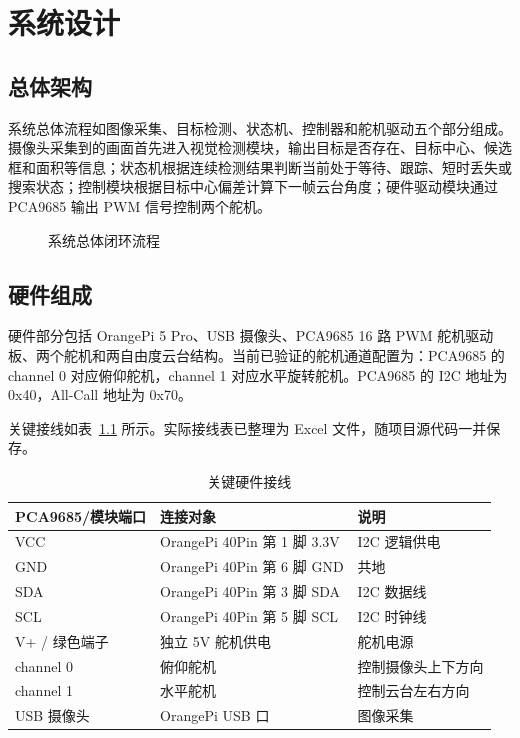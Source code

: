 \chapter{系统设计}

\section{总体架构}

系统总体流程如图像采集、目标检测、状态机、控制器和舵机驱动五个部分组成。摄像头采集到的画面首先进入视觉检测模块，输出目标是否存在、目标中心、候选框和面积等信息；状态机根据连续检测结果判断当前处于等待、跟踪、短时丢失或搜索状态；控制模块根据目标中心偏差计算下一帧云台角度；硬件驱动模块通过 PCA9685 输出 PWM 信号控制两个舵机。

\begin{figure}[htbp]
  \centering
  \caption{系统总体闭环流程}
  \label{fig:system-flow}
\end{figure}

\section{硬件组成}

硬件部分包括 OrangePi 5 Pro、USB 摄像头、PCA9685 16 路 PWM 舵机驱动板、两个舵机和两自由度云台结构。当前已验证的舵机通道配置为：PCA9685 的 channel 0 对应俯仰舵机，channel 1 对应水平旋转舵机。PCA9685 的 I2C 地址为 0x40，All-Call 地址为 0x70。

关键接线如表~\ref{tab:wiring} 所示。实际接线表已整理为 Excel 文件，随项目源代码一并保存。

\begin{table}[htbp]
  \centering
  \caption{关键硬件接线}
  \label{tab:wiring}
  \begin{tabular}{lll}
    \toprule
    PCA9685/模块端口 & 连接对象 & 说明 \\
    \midrule
    VCC & OrangePi 40Pin 第 1 脚 3.3V & I2C 逻辑供电 \\
    GND & OrangePi 40Pin 第 6 脚 GND & 共地 \\
    SDA & OrangePi 40Pin 第 3 脚 SDA & I2C 数据线 \\
    SCL & OrangePi 40Pin 第 5 脚 SCL & I2C 时钟线 \\
    V+ / 绿色端子 & 独立 5V 舵机供电 & 舵机电源 \\
    channel 0 & 俯仰舵机 & 控制摄像头上下方向 \\
    channel 1 & 水平舵机 & 控制云台左右方向 \\
    USB 摄像头 & OrangePi USB 口 & 图像采集 \\
    \bottomrule
  \end{tabular}
\end{table}

